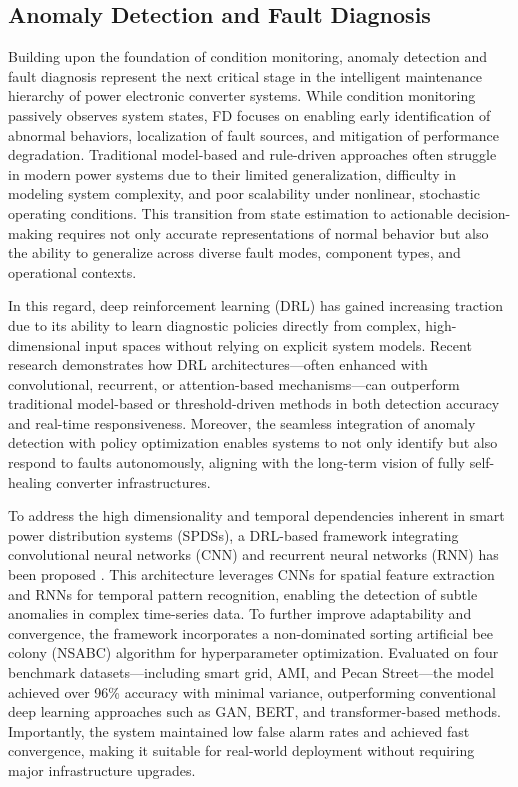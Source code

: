 \subsection{Anomaly Detection and Fault Diagnosis}
\label{sec:fault_diagnosis}

Building upon the foundation of condition monitoring, anomaly detection and fault diagnosis represent the next critical stage in the intelligent maintenance hierarchy of power electronic converter systems. While condition monitoring passively observes system states, FD focuses on enabling early identification of abnormal behaviors, localization of fault sources, and mitigation of performance degradation. Traditional model-based and rule-driven approaches often struggle in modern power systems due to their limited generalization, difficulty in modeling system complexity, and poor scalability under nonlinear, stochastic operating conditions. This transition from state estimation to actionable decision-making requires not only accurate representations of normal behavior but also the ability to generalize across diverse fault modes, component types, and operational contexts.

In this regard, deep reinforcement learning (DRL) has gained increasing traction due to its ability to learn diagnostic policies directly from complex, high-dimensional input spaces without relying on explicit system models. Recent research demonstrates how DRL architectures—often enhanced with convolutional, recurrent, or attention-based mechanisms—can outperform traditional model-based or threshold-driven methods in both detection accuracy and real-time responsiveness. Moreover, the seamless integration of anomaly detection with policy optimization enables systems to not only identify but also respond to faults autonomously, aligning with the long-term vision of fully self-healing converter infrastructures.

To address the high dimensionality and temporal dependencies inherent in smart power distribution systems (SPDSs), a DRL-based framework integrating convolutional neural networks (CNN) and recurrent neural networks (RNN) has been proposed \cite{nevisi2025evolutionary}. This architecture leverages CNNs for spatial feature extraction and RNNs for temporal pattern recognition, enabling the detection of subtle anomalies in complex time-series data. To further improve adaptability and convergence, the framework incorporates a non-dominated sorting artificial bee colony (NSABC) algorithm for hyperparameter optimization. Evaluated on four benchmark datasets—including smart grid, AMI, and Pecan Street—the model achieved over 96\% accuracy with minimal variance, outperforming conventional deep learning approaches such as GAN, BERT, and transformer-based methods. Importantly, the system maintained low false alarm rates and achieved fast convergence, making it suitable for real-world deployment without requiring major infrastructure upgrades.

